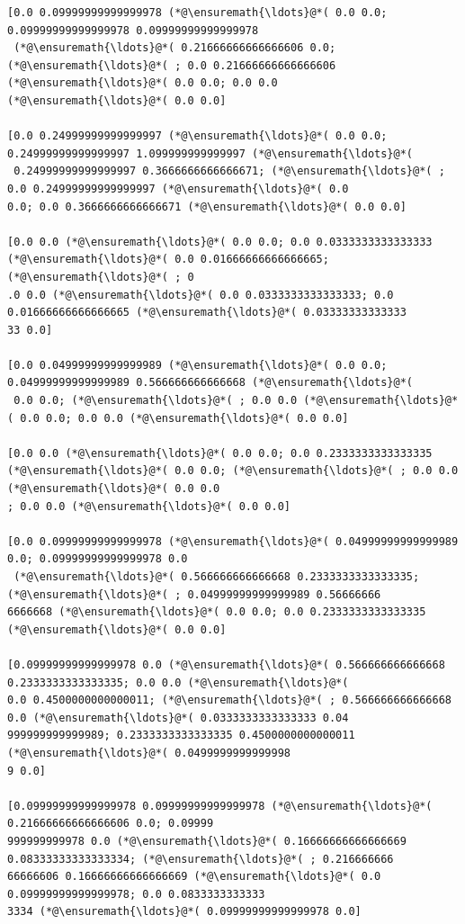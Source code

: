 \documentclass[12pt,a4paper]{article}
\begin{document}
\begin{lstlisting}
[0.0 0.09999999999999978 (*@\ensuremath{\ldots}@*( 0.0 0.0; 0.09999999999999978 0.09999999999999978
 (*@\ensuremath{\ldots}@*( 0.21666666666666606 0.0; (*@\ensuremath{\ldots}@*( ; 0.0 0.21666666666666606 (*@\ensuremath{\ldots}@*( 0.0 0.0; 0.0 0.0 
(*@\ensuremath{\ldots}@*( 0.0 0.0]

[0.0 0.24999999999999997 (*@\ensuremath{\ldots}@*( 0.0 0.0; 0.24999999999999997 1.099999999999997 (*@\ensuremath{\ldots}@*(
 0.24999999999999997 0.3666666666666671; (*@\ensuremath{\ldots}@*( ; 0.0 0.24999999999999997 (*@\ensuremath{\ldots}@*( 0.0 
0.0; 0.0 0.3666666666666671 (*@\ensuremath{\ldots}@*( 0.0 0.0]

[0.0 0.0 (*@\ensuremath{\ldots}@*( 0.0 0.0; 0.0 0.0333333333333333 (*@\ensuremath{\ldots}@*( 0.0 0.01666666666666665; (*@\ensuremath{\ldots}@*( ; 0
.0 0.0 (*@\ensuremath{\ldots}@*( 0.0 0.0333333333333333; 0.0 0.01666666666666665 (*@\ensuremath{\ldots}@*( 0.03333333333333
33 0.0]

[0.0 0.04999999999999989 (*@\ensuremath{\ldots}@*( 0.0 0.0; 0.04999999999999989 0.566666666666668 (*@\ensuremath{\ldots}@*(
 0.0 0.0; (*@\ensuremath{\ldots}@*( ; 0.0 0.0 (*@\ensuremath{\ldots}@*( 0.0 0.0; 0.0 0.0 (*@\ensuremath{\ldots}@*( 0.0 0.0]

[0.0 0.0 (*@\ensuremath{\ldots}@*( 0.0 0.0; 0.0 0.2333333333333335 (*@\ensuremath{\ldots}@*( 0.0 0.0; (*@\ensuremath{\ldots}@*( ; 0.0 0.0 (*@\ensuremath{\ldots}@*( 0.0 0.0
; 0.0 0.0 (*@\ensuremath{\ldots}@*( 0.0 0.0]

[0.0 0.09999999999999978 (*@\ensuremath{\ldots}@*( 0.04999999999999989 0.0; 0.09999999999999978 0.0
 (*@\ensuremath{\ldots}@*( 0.566666666666668 0.2333333333333335; (*@\ensuremath{\ldots}@*( ; 0.04999999999999989 0.56666666
6666668 (*@\ensuremath{\ldots}@*( 0.0 0.0; 0.0 0.2333333333333335 (*@\ensuremath{\ldots}@*( 0.0 0.0]

[0.09999999999999978 0.0 (*@\ensuremath{\ldots}@*( 0.566666666666668 0.2333333333333335; 0.0 0.0 (*@\ensuremath{\ldots}@*( 
0.0 0.4500000000000011; (*@\ensuremath{\ldots}@*( ; 0.566666666666668 0.0 (*@\ensuremath{\ldots}@*( 0.0333333333333333 0.04
999999999999989; 0.2333333333333335 0.4500000000000011 (*@\ensuremath{\ldots}@*( 0.0499999999999998
9 0.0]

[0.09999999999999978 0.09999999999999978 (*@\ensuremath{\ldots}@*( 0.21666666666666606 0.0; 0.09999
999999999978 0.0 (*@\ensuremath{\ldots}@*( 0.16666666666666669 0.08333333333333334; (*@\ensuremath{\ldots}@*( ; 0.216666666
66666606 0.16666666666666669 (*@\ensuremath{\ldots}@*( 0.0 0.09999999999999978; 0.0 0.0833333333333
3334 (*@\ensuremath{\ldots}@*( 0.09999999999999978 0.0]


\end{lstlisting}
\end{document}
